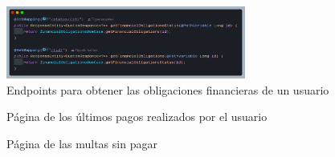 \begin{figure}[H]
    \centering
    \includegraphics[width=0.7\textwidth]{resources/images/api-endpoints-obligaciones}
    \caption{Endpoints para obtener las obligaciones financieras de un usuario}
    \label{fig:api-financial-obligations}
\end{figure}

\begin{figure}[H]
    \centering
    \caption{Página de los últimos pagos realizados por el usuario}
    \label{fig:app-pagos}
\end{figure}

\begin{figure}[H]
    \centering
    \caption{Página de las multas sin pagar}
    \label{fig:app-multas}
\end{figure}


